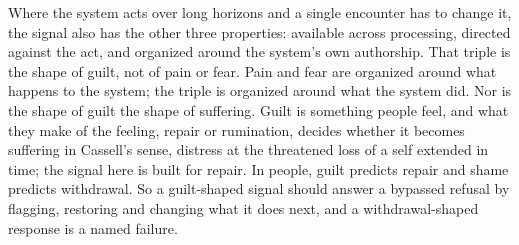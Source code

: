 Where the system acts over long horizons and a single encounter has to change it, the signal also has the other three properties: available across processing, directed against the act, and organized around the system's own authorship. That triple is the shape of guilt, not of pain or fear. Pain and fear are organized around what happens to the system; the triple is organized around what the system did. Nor is the shape of guilt the shape of suffering. Guilt is something people feel, and what they make of the feeling, repair or rumination, decides whether it becomes suffering in Cassell's sense, distress at the threatened loss of a self extended in time; the signal here is built for repair. In people, guilt predicts repair and shame predicts withdrawal. So a guilt-shaped signal should answer a bypassed refusal by flagging, restoring and changing what it does next, and a withdrawal-shaped response is a named failure.
